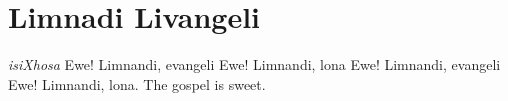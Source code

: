 \starttocol
\chapter{Limnadi Livangeli}
\nexttocol
\hfill{\it isiXhosa}
\stoptocol
\starttocol
\startlines
E{\sc we!} Limnandi, evangeli
Ewe! Limnandi, lona
Ewe! Limnandi, evangeli
Ewe! Limnandi, lona.
\stoplines
\nexttocol
The gospel is sweet.
\stoptocol
